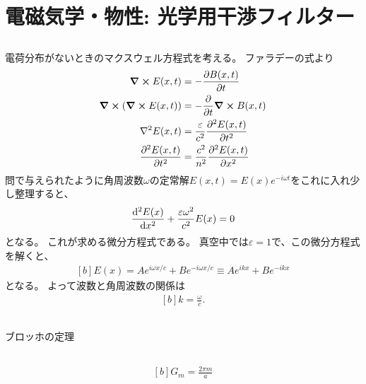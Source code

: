 \documentclass[../../master.tex]{subfiles}
\begin{document}
\chapter{電磁気学・物性: 光学用干渉フィルター}
\section{}
電荷分布がないときのマクスウェル方程式を考える。
ファラデーの式より
\begin{equation}\begin{aligned}[b]
    \curl E(x,t) &= -\pdv{B(x,t)}{t}\\
    \curl (\curl E(x,t)) &= -\pdv{t}\curl B(x,t)\\
    \laplacian E(x,t) &= \frac{\varepsilon}{c^2} \pdv[2]{E(x,t)}{t}\\
    \pdv[2]{E(x,t)}{t} &= \frac{c^2}{n^2}\pdv[2]{E(x,t)}{x}
\end{aligned}\end{equation}
問で与えられたように角周波数\(\omega\)の定常解\(E(x,t)=E(x)e^{-i\omega t}\)をこれに入れ少し整理すると、
\begin{equation}\begin{aligned}[b]
    \dv[2]{E(x)}{x}+\frac{\varepsilon \omega^2}{c^2}E(x)=0
\end{aligned}\end{equation}
となる。
これが求める微分方程式である。
真空中では\(\varepsilon=1\)で、この微分方程式を解くと、
\begin{equation}\begin{aligned}[b]
    E(x) = Ae^{i\omega x/c} + Be^{-i\omega x/c} \equiv Ae^{ikx}+Be^{-ikx}
\end{aligned}\end{equation}
となる。
よって波数と角周波数の関係は
\begin{equation}\begin{aligned}[b]
    k = \frac{\omega}{c}.
\end{aligned}\end{equation}

\section{}
ブロッホの定理

\section{}
\begin{equation}\begin{aligned}[b]
    G_m = \frac{2\pi m}{a}
\end{aligned}\end{equation}
\end{document}
